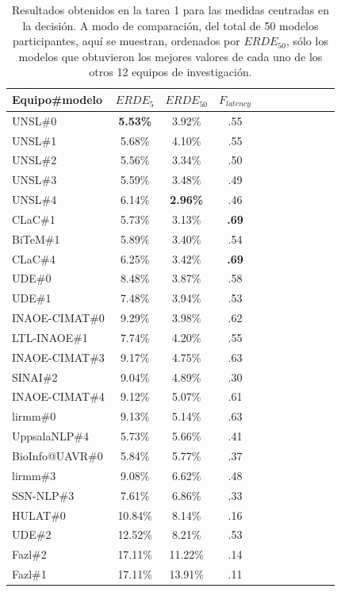 \begin{table}[t!]
\centering
\caption{Resultados obtenidos en la tarea 1 para las medidas centradas en la decisión. A modo de comparación, del total de 50 modelos participantes, aquí se muestran, ordenados por $ERDE_{50}$, sólo los modelos que obtuvieron los mejores valores de cada uno de los otros 12 equipos de investigación.}
\label{tab:t1-result}
\begin{tabular}{l c c c c c c c c c c}
\hline
Equipo\#modelo & $ERDE_5$ & $ERDE_{50}$ & $F_{latency}$\\ \hline

UNSL\#0 & \textbf{5.53\%} & 3.92\% & .55 \\
UNSL\#1 & 5.68\% & 4.10\% & .55 \\
UNSL\#2 & 5.56\% & 3.34\% & .50 \\
UNSL\#3 & 5.59\% & 3.48\% & .49 \\
UNSL\#4 & 6.14\% & \textbf{2.96\%} & .46 \\
\hline
\hline
CLaC\#1 & 5.73\% & 3.13\% & \textbf{.69} \\
BiTeM\#1 & 5.89\% & 3.40\% & .54 \\
CLaC\#4 & 6.25\% & 3.42\% & \textbf{.69} \\
UDE\#0 & 8.48\% & 3.87\% & .58 \\
UDE\#1 & 7.48\% & 3.94\% & .53 \\
INAOE-CIMAT\#0 & 9.29\% & 3.98\% & .62 \\
LTL-INAOE\#1 & 7.74\% & 4.20\% & .55 \\
INAOE-CIMAT\#3 & 9.17\% & 4.75\% & .63 \\
SINAI\#2 & 9.04\% & 4.89\% & .30 \\
INAOE-CIMAT\#4 & 9.12\% & 5.07\% & .61 \\
lirmm\#0 & 9.13\% & 5.14\% & .63 \\
UppsalaNLP\#4 & 5.73\% & 5.66\% & .41 \\
BioInfo@UAVR\#0 & 5.84\% & 5.77\% & .37 \\
lirmm\#3 & 9.08\% & 6.62\% & .48 \\
SSN-NLP\#3 & 7.61\% & 6.86\% & .33 \\
HULAT\#0 & 10.84\% & 8.14\% & .16 \\
UDE\#2 & 12.52\% & 8.21\% & .53 \\
Fazl\#2 & 17.11\% & 11.22\% & .14 \\
Fazl\#1 & 17.11\% & 13.91\% & .11 \\

\hline
\end{tabular}
\end{table}

